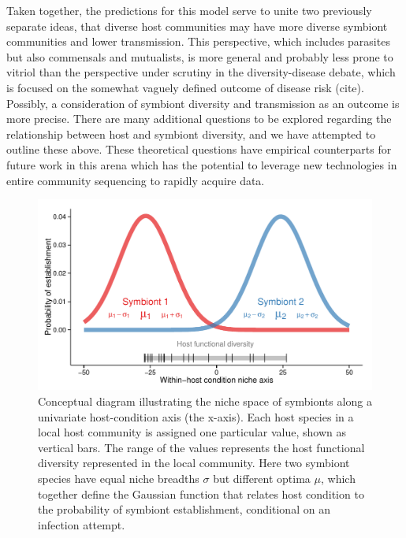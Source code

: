 \documentclass[12pt]{article}
\begin{document}
Taken together, the predictions for this model serve to unite two previously separate ideas, that diverse host communities may have more diverse symbiont communities and lower transmission. 
This perspective, which includes parasites but also commensals and mutualists, is more general and probably less prone to vitriol than the perspective under scrutiny in the diversity-disease debate, which is focused on the somewhat vaguely defined outcome of disease risk (cite). 
Possibly, a consideration of symbiont diversity and transmission as an outcome is more precise. 
There are many additional questions to be explored regarding the relationship between host and symbiont diversity, and we have attempted to outline these above.
These theoretical questions have empirical counterparts for future work in this arena which has the potential to leverage new technologies in entire community sequencing to rapidly acquire data. 




\newpage

\begin{figure}[ht]\centering
\includegraphics[width=\linewidth]{fig/niche.pdf}
\caption{Conceptual diagram illustrating the niche space of symbionts along a univariate host-condition axis (the x-axis). Each host species in a local host community is assigned one particular value, shown as vertical bars. The range of the values represents the host functional diversity represented in the local community. Here two symbiont species have equal niche breadths $\sigma$ but different optima $\mu$, which together define the Gaussian function that relates host condition to the probability of symbiont establishment, conditional on an infection attempt.}
\label{fig:niche}
\end{figure}
\end{document}
